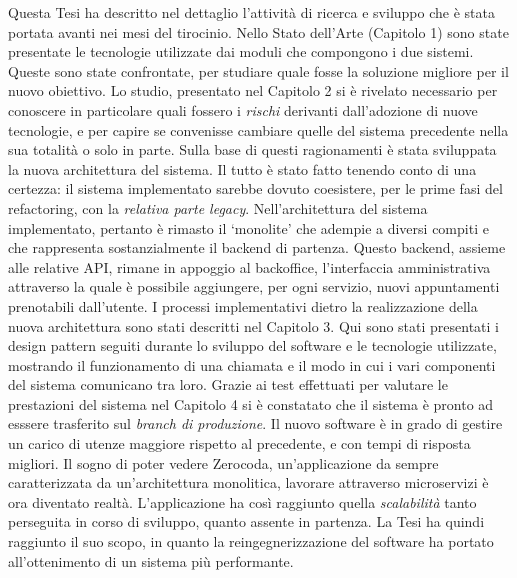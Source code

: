 Questa Tesi ha descritto nel dettaglio l'attività di ricerca e sviluppo che è stata portata avanti nei mesi del tirocinio. Nello Stato dell'Arte (Capitolo 1) sono state presentate le tecnologie utilizzate dai moduli che compongono i due sistemi. Queste sono state confrontate, per studiare quale fosse la soluzione migliore per il nuovo obiettivo. Lo studio, presentato nel Capitolo 2 si è rivelato necessario per conoscere in particolare quali fossero i \emph{rischi} derivanti dall'adozione di nuove tecnologie, e per capire se convenisse cambiare quelle del sistema precedente nella sua totalità o solo in parte. Sulla base di questi ragionamenti è stata sviluppata la nuova architettura del sistema. Il tutto è stato fatto tenendo conto di una certezza: il sistema implementato sarebbe dovuto coesistere, per le prime fasi del refactoring, con la \emph{relativa parte legacy}. Nell'architettura del sistema implementato, pertanto è rimasto il `monolite' che adempie a diversi compiti e che rappresenta sostanzialmente il backend di partenza. Questo backend, assieme alle relative API, rimane in appoggio al backoffice, l'interfaccia amministrativa attraverso la quale è possibile aggiungere, per ogni servizio, nuovi appuntamenti prenotabili dall'utente. I processi implementativi dietro la realizzazione della nuova architettura sono stati descritti nel Capitolo 3. Qui sono stati presentati i design pattern seguiti durante lo sviluppo del software e le tecnologie utilizzate, mostrando il funzionamento di una chiamata e il modo in cui i vari componenti del sistema comunicano tra loro. Grazie ai test effettuati per valutare le prestazioni del sistema nel Capitolo 4 si è constatato che il sistema è pronto ad esssere trasferito sul \emph{branch di produzione}. Il nuovo software è in grado di gestire un carico di utenze maggiore rispetto al precedente, e con tempi di risposta migliori. Il sogno di poter vedere Zerocoda, un'applicazione da sempre caratterizzata da un'architettura monolitica, lavorare attraverso microservizi è ora diventato realtà. L'applicazione ha così raggiunto quella \emph{scalabilità} tanto perseguita in corso di sviluppo, quanto assente in partenza. La Tesi ha quindi raggiunto il suo scopo, in quanto la reingegnerizzazione del software ha portato all'ottenimento di un sistema più performante.

